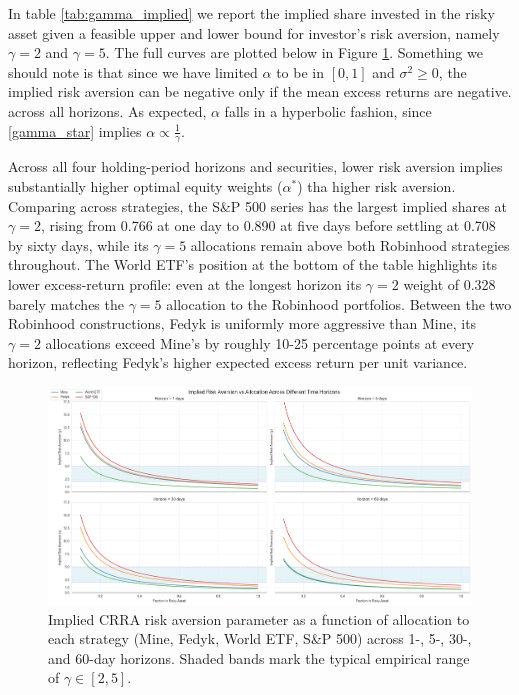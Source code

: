 In table \ref{tab:gamma_implied} we report the implied share invested in the risky asset given a feasible upper and lower bound for investor's risk aversion, namely $\gamma=2$ and $\gamma=5$.
The full curves are plotted below in Figure \ref{fig:alpha_gamma}.
Something we should note is that since we have limited $\alpha$ to be in $[0,1]$ and $\sigma^2 \geq 0$, the implied risk aversion can be negative only if the mean excess returns are negative.
across all horizons.
As expected, $\alpha$ falls in a hyperbolic fashion, since \ref{gamma_star} implies $\alpha \propto \frac{1}{\gamma}$.

Across all four holding-period horizons and securities, lower risk aversion implies substantially higher optimal equity weights ($\alpha^*$) tha higher risk aversion.
Comparing across strategies, the S\&P 500 series has the largest implied shares at $\gamma=2$, rising from 0.766 at one day to 0.890 at five days before settling at 0.708 by sixty days, while its $\gamma=5$ allocations remain above both Robinhood strategies throughout. 
The World ETF's position at the bottom of the table highlights its lower excess-return profile: even at the longest horizon its $\gamma=2$ weight of 0.328 barely matches the $\gamma=5$ allocation to the Robinhood portfolios. 
Between the two Robinhood constructions, Fedyk is uniformly more aggressive than Mine, its $\gamma=2$ allocations exceed Mine's by roughly 10-25 percentage points at every horizon, reflecting Fedyk's higher expected excess return per unit variance.

\begin{figure}[H]
    \centering
    \includegraphics[width=\linewidth]{../images/alpha_gamma.png}
\caption{Implied CRRA risk aversion parameter as a function of allocation to each strategy (Mine, Fedyk, World ETF, S\&P 500) across 1-, 5-, 30-, and 60-day horizons. Shaded bands mark the typical empirical range of $\gamma \in [2,5]$.}
\label{fig:alpha_gamma}
\end{figure}    


